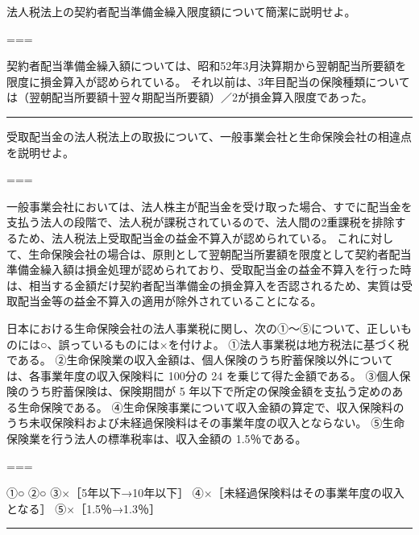 \documentclass[report,gutter=10mm,fore-edge=10mm,uplatex,dvipdfmx]{jlreq}
\begin{document}

法人税法上の契約者配当準備金繰入限度額について簡潔に説明せよ。

===


契約者配当準備金繰入額については、昭和52年3月決算期から翌朝配当所要額を限度に損金算入が認められている。
それ以前は、3年目配当の保険種類については（翌朝配当所要額十翌々期配当所要額）／2が損金算入限度であった。

\begin{center}\rule{0.5\linewidth}{0.5pt}\end{center}


受取配当金の法人税法上の取扱について、一般事業会社と生命保険会社の相違点を説明せよ。

===


一般事業会社においては、法人株主が配当金を受け取った場合、すでに配当金を支払う法人の段階で、法人税が課税されているので、法人間の2重課税を排除するため、法人税法上受取配当金の益金不算入が認められている。
これに対して、生命保険会社の場合は、原則として翌朝配当所婁額を限度として契約者配当準備金繰入額は損金処理が認められており、受取配当金の益金不算入を行った時は、相当する金額だけ契約者配当準備金の損金算入を否認されるため、実質は受取配当金等の益金不算入の適用が除外されていることになる。


日本における生命保険会社の法人事業税に関し、次の①～⑤について、正しいものには○、誤っているものには×を付けよ。
①法人事業税は地方税法に基づく税である。
②生命保険業の収入金額は、個人保険のうち貯蓄保険以外については、各事業年度の収入保険料に
100分の 24 を乗じて得た金額である。
③個人保険のうち貯蓄保険は、保険期間が 5
年以下で所定の保険金額を支払う定めのある生命保険である。
④生命保険事業について収入金額の算定で、収入保険料のうち未収保険料および未経過保険料はその事業年度の収入とならない。
⑤生命保険業を行う法人の標準税率は、収入金額の 1.5％である。

===


①○ ②○ ③×［5年以下→10年以下］
④×［未経過保険料はその事業年度の収入となる］ ⑤×［1.5％→1.3％］

\begin{center}\rule{0.5\linewidth}{0.5pt}\end{center}
\end{document}
